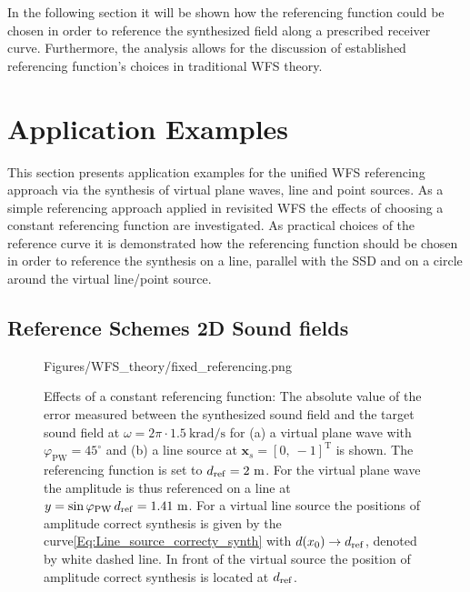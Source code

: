In the following section it will be shown how the referencing function could be chosen in order to reference the synthesized field along a prescribed receiver curve. 
Furthermore, the analysis allows for the discussion of established referencing function's choices in traditional WFS theory.



\section{Application Examples}
\label{Sec:examples}

This section presents application examples for the unified WFS referencing approach via the synthesis of virtual plane waves, line and point sources.
As a simple referencing approach applied in revisited WFS \cite{Ahrens2012} the effects of choosing a constant referencing function are investigated.
As practical choices of the reference curve it is demonstrated how the referencing function should be chosen in order to reference the synthesis on a line, parallel with the SSD and on a circle around the virtual line/point source.

\subsection{Reference Schemes 2D Sound fields}

\begin{figure}
	\centering
	\begin{overpic}[width = .85\columnwidth ]{Figures/WFS_theory/fixed_referencing.png}
	\scriptsize
	\end{overpic}
\caption{Effects of a constant referencing function: The absolute value of the error measured between the synthesized sound field and the target sound field at $\omega = 2\pi\cdot 1.5~\mathrm{krad/s}$ for (a) a virtual plane wave with $\varphi_\text{PW} = 45^{\circ}$ and (b) a line source at $\mathbf{x}_s = [0,\ -1]^{\mathrm{T}}$ is shown. The referencing function is set to $d_{\mathrm{ref}} = 2~\mathrm{m}$. 
For the virtual plane wave the amplitude is thus referenced on a line at $y = \sin\varphi_\text{PW}\,d_{\mathrm{ref}} = 1.41~\mathrm{m}$. 
For a virtual line source the positions of amplitude correct synthesis is given by the curve\eqref{Eq:Line_source_correcty_synth} with $d(x_0) \rightarrow d_{\mathrm{ref}}$, denoted by white dashed line. 
In front of the virtual source the position of amplitude correct synthesis is located at $d_{\mathrm{ref}}$.}
	\label{Fig:Theory:fixed_referencing}
\end{figure}

